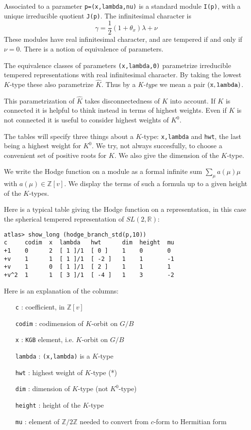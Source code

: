 \documentclass[12pt,leqno]{article}
\newcommand{\R}{\mathbb R}
\newcommand{\Z}{\mathbb Z}
\newcommand\wh{\widehat}
\begin{document}
Associated to a parameter {\tt p=(x,lambda,nu)} is a standard module
{\tt I(p)}, with a unique irreducible quotient {\tt J(p)}.
The infinitesimal character is
$$
\gamma=\frac12(1+\theta_x)\lambda+\nu
$$
These modules have real infinitesimal character, and are tempered if and only if $\nu=0$.
There is a notion of equivalence of parameters.

The equivalence classes of parameters {\tt (x,lambda,0)} parametrize
irreducible tempered representations with real infinitesimal
character. By taking the lowest $K$-type these also parametrize
$\wh K$. Thus by a {\it K-type} we mean a pair ${\tt (x,lambda)}$.

This parametrization of $\wh K$ takes disconnectedness of $K$ into account.
If $K$ is connected it is helpful to think instead in terms of highest weights.
Even if $K$ is not connected it is useful to consider highest weights of $K^0$.

The tables will specify three things about a $K$-type: {\tt x,lambda}
and {\tt hwt}, the last being a highest weight for $K^0$.  We try, not
always succesfully, to choose a convenient set of positive roots for $K$.
We also give the dimension of the $K$-type.

We write the Hodge function on a module as a formal infinite sum
$\sum_\mu a(\mu)\mu$ with $a(\mu)\in \Z[v]$.  We display the terms of
such a formula up to a given height of the $K$-types.

Here is a typical table giving the Hodge function on a representation, in this case
the spherical tempered representation of $SL(2,\R)$:
\begin{verbatim}
atlas> show_long (hodge_branch_std(p,10))
c     codim  x  lambda   hwt      dim  height  mu
+1    0      2  [ 1 ]/1  [ 0 ]    1    0       0
+v    1      1  [ 1 ]/1  [ -2 ]   1    1       -1
+v    1      0  [ 1 ]/1  [ 2 ]    1    1       1
+v^2  1      1  [ 3 ]/1  [ -4 ]   1    3       -2
\end{verbatim}


Here is an explanation of the columns:

\begin{itemize}
\item[{\tt c}]: coefficient, in $\Z[v]$
\item[{\tt codim}]: codimension of $K$-orbit on $G/B$
\item[{\tt x}]: {\tt KGB} element, i.e. $K$-orbit on $G/B$
\item[{\tt lambda}]: {\tt (x,lambda)} is a $K$-type
\item[{\tt hwt}]: highest weight of $K$-type (*)
  \item[{\tt dim}]: dimension of $K$-type (not $K^0$-type)
  \item[{\tt height}]: height of the $K$-type
\item[{\tt mu}]: element of $\Z/2\Z$ needed to convert from $c$-form to Hermitian form
\end{itemize}
\end{document}
